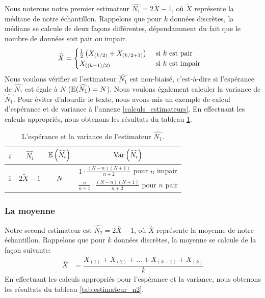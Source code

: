 \documentclass[10pt]{article}
\begin{document}
Nous noterons notre premier estimateur
\(\widehat{N_1}=2\widetilde{X}-1\), où \(\widetilde{X}\) représente la
médiane de notre échantillon. Rappelons que pour \(k\) données
discrètes, la médiane se calcule de deux façons différentes,
dépendamment du fait que le nombre de données soit pair ou impair.
\begin{align*}
\widetilde{X} &= 
\begin{cases}
\frac{1}{2}\left(X_{\left(k/2\right)}+X_{\left(k/2+1\right)}\right) & \text{ si $k$ est pair} \\
X_{\left((k+1)/2\right)} & \text{ si $k$ est impair} \\
\end{cases}
\end{align*} Nous voulons vérifier si l'estimateur \(\widehat{N_1}\) est
non-biaisé, c'est-à-dire si l'espérance de \(\widehat{N_1}\) est égale à
\(N\) (\(\operatorname{\mathbb{E}} (\widehat{N_1})=N\)). Nous voulons également calculer la
variance de \(\widehat{N_1}\). Pour éviter d'alourdir le texte, nous
avons mis un exemple de calcul d'espérance et de variance à l'annexe
\ref{calculs_estimateurs}. En effectuant les calculs appropriés, nous
obtenons les résultats du tableau \ref{tab:estimateur_n1}.

\begin{table}[ht]
\begin{center}
\begin{tabular}{|c|c|c|c|}
\hline
$i$ & $\widehat{N_i}$ & $\operatorname{\mathbb{E}}\left(\widehat{N_i}\right)$ & $\operatorname{Var}\left(\widehat{N_i}\right)$ \\
\hline
\hline
\multirow{2}{*}{1}  & \multirow{2}{*}{$2\widetilde{X}-1$} & \multirow{2}{*}{$N$} & 
$1\cdot\frac{(N-n)(N+1)}{n+2}$ pour $n$ impair \\
& & & $\frac{n}{n+1}\cdot\frac{(N-n)(N+1)}{n+2}$ pour $n$ pair \\
\hline
\end{tabular}
\end{center}
\caption{\label{tab:estimateur_n1} {L'espérance et la variance de l'estimateur $\widehat{N_1}$.} }
\end{table}

\hypertarget{la-moyenne}{%
\subsubsection{La moyenne}\label{la-moyenne}}

Notre second estimateur est \(\widehat{N_2}=2\overline{X}-1\), où
\(\overline{X}\) représente la moyenne de notre échantillon. Rappelons
que pour \(k\) données discrètes, la moyenne se calcule de la façon
suivante: \begin{align*}
\overline{X} &= \dfrac{X_{(1)}+X_{(2)}+\ldots +X_{(k-1)}+X_{(k)}}{k}
\end{align*} En effectuant les calculs appropriés pour l'espérance et la
variance, nous obtenons les résultats du tableau
\ref{tab:estimateur_n2}.
\end{document}
